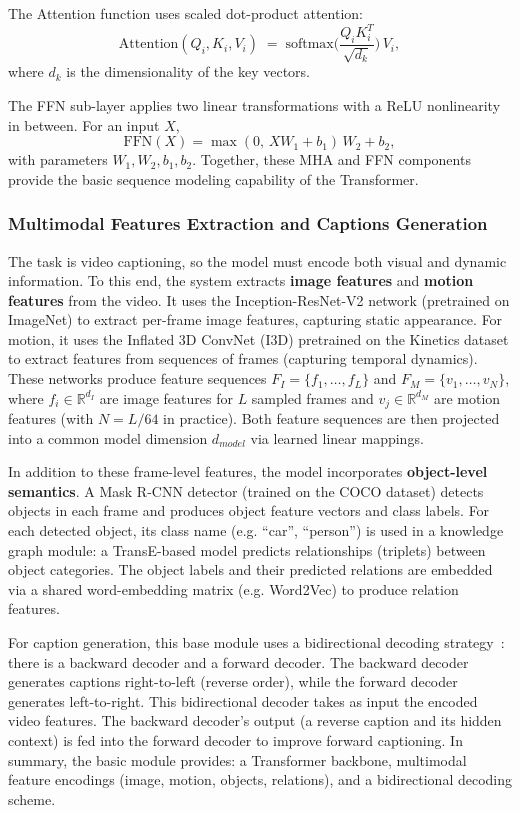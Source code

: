 The Attention function uses scaled dot-product attention:
$$
\mathrm{Attention}(Q_i,K_i,V_i) \;=\; \mathrm{softmax}\Big(\frac{Q_iK_i^T}{\sqrt{d_k}}\Big)\,V_i,
$$
where $d_k$ is the dimensionality of the key vectors.

The FFN sub-layer applies two linear transformations with a ReLU nonlinearity in between. For an input $X$,
$$
\mathrm{FFN}(X) = \max(0,\,XW_1 + b_1)\,W_2 + b_2,
$$
with parameters $W_1,W_2,b_1,b_2$. Together, these MHA and FFN components provide the basic sequence modeling capability of the Transformer.

\subsubsection{Multimodal Features Extraction and Captions Generation}

The task is video captioning, so the model must encode both visual and dynamic information. To this end, the system extracts \textbf{image features} and \textbf{motion features} from the video. It uses the Inception-ResNet-V2 network (pretrained on ImageNet) to extract per-frame image features, capturing static appearance. For motion, it uses the Inflated 3D ConvNet (I3D) pretrained on the Kinetics dataset to extract features from sequences of frames (capturing temporal dynamics). These networks produce feature sequences $F_I=\{f_1,\dots,f_L\}$ and $F_M=\{v_1,\dots,v_N\}$, where $f_i\in\mathbb{R}^{d_I}$ are image features for $L$ sampled frames and $v_j\in\mathbb{R}^{d_M}$ are motion features (with $N=L/64$ in practice). Both feature sequences are then projected into a common model dimension $d_{model}$ via learned linear mappings.

In addition to these frame-level features, the model incorporates \textbf{object-level semantics}. A Mask R-CNN detector (trained on the COCO dataset) detects objects in each frame and produces object feature vectors and class labels. For each detected object, its class name (e.g. ``car'', ``person'') is used in a knowledge graph module: a TransE-based model predicts relationships (triplets) between object categories. The object labels and their predicted relations are embedded via a shared word-embedding matrix (e.g. Word2Vec) to produce relation features.

For caption generation, this base module uses a bidirectional decoding strategy~\cite{BiTransformer}: there is a backward decoder and a forward decoder. The backward decoder generates captions right-to-left (reverse order), while the forward decoder generates left-to-right. This bidirectional decoder takes as input the encoded video features. The backward decoder's output (a reverse caption and its hidden context) is fed into the forward decoder to improve forward captioning. In summary, the basic module provides: a Transformer backbone, multimodal feature encodings (image, motion, objects, relations), and a bidirectional decoding scheme.

